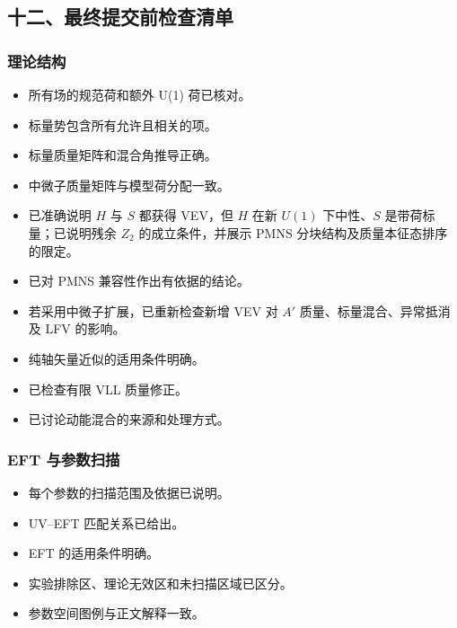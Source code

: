 \documentclass[
  chinese,
  UTF8]{ctexart}
\providecommand{\tightlist}{%
  \setlength{\itemsep}{0pt}\setlength{\parskip}{0pt}}
\begin{document}
\subsection{十二、最终提交前检查清单}\label{ux5341ux4e8cux6700ux7ec8ux63d0ux4ea4ux524dux68c0ux67e5ux6e05ux5355}

\subsubsection{理论结构}\label{ux7406ux8bbaux7ed3ux6784}

\begin{itemize}
\tightlist
\item[$\square$]
  所有场的规范荷和额外 U(1) 荷已核对。
\item[$\square$]
  标量势包含所有允许且相关的项。
\item[$\square$]
  标量质量矩阵和混合角推导正确。
\item[$\square$]
  中微子质量矩阵与模型荷分配一致。
\item[$\square$]
  已准确说明 \(H\) 与 \(S\) 都获得 VEV，但 \(H\) 在新 \(U(1)\)
  下中性、\(S\) 是带荷标量；已说明残余 \(Z_2\) 的成立条件，并展示 PMNS
  分块结构及质量本征态排序的限定。
\item[$\square$]
  已对 PMNS 兼容性作出有依据的结论。
\item[$\square$]
  若采用中微子扩展，已重新检查新增 VEV 对 \(A'\)
  质量、标量混合、异常抵消及 LFV 的影响。
\item[$\square$]
  纯轴矢量近似的适用条件明确。
\item[$\square$]
  已检查有限 VLL 质量修正。
\item[$\square$]
  已讨论动能混合的来源和处理方式。
\end{itemize}

\subsubsection{EFT 与参数扫描}\label{eft-ux4e0eux53c2ux6570ux626bux63cf}

\begin{itemize}
\tightlist
\item[$\square$]
  每个参数的扫描范围及依据已说明。
\item[$\square$]
  UV--EFT 匹配关系已给出。
\item[$\square$]
  EFT 的适用条件明确。
\item[$\square$]
  实验排除区、理论无效区和未扫描区域已区分。
\item[$\square$]
  参数空间图例与正文解释一致。
\end{itemize}
\end{document}
